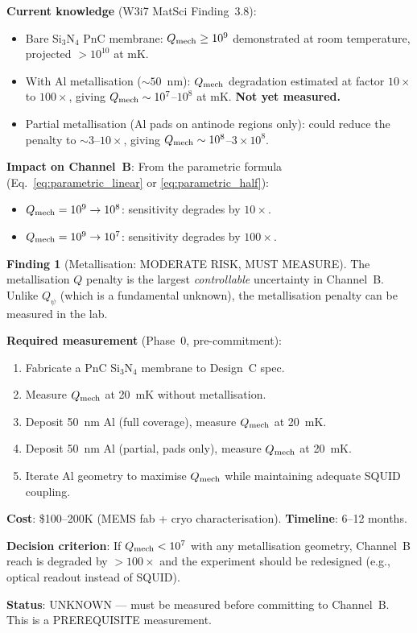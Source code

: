 \documentclass[11pt]{article}
\newcommand{\ee}[1]{\times 10^{#1}}
\newcommand{\Qpsi}{Q_\psi}
\newcommand{\Qmech}{Q_{\rm mech}}
\theoremstyle{definition}
\newtheorem{finding}[theorem]{Finding}
\theoremstyle{remark}
\begin{document}
\textbf{Current knowledge} (W3i7 MatSci Finding~3.8):
\begin{itemize}[nosep]
\item Bare Si$_3$N$_4$ PnC membrane: $\Qmech \geq 10^9$ demonstrated
  at room temperature, projected $> 10^{10}$ at mK.
\item With Al metallisation ($\sim 50$~nm): $\Qmech$ degradation
  estimated at factor $10\times$ to $100\times$, giving
  $\Qmech \sim 10^7$--$10^8$ at mK. \textbf{Not yet measured.}
\item Partial metallisation (Al pads on antinode regions only):
  could reduce the penalty to $\sim 3$--$10\times$, giving
  $\Qmech \sim 10^8$--$3\ee{8}$.
\end{itemize}

\textbf{Impact on Channel~B}: From the parametric formula
(Eq.~\eqref{eq:parametric_linear} or \eqref{eq:parametric_half}):
\begin{itemize}[nosep]
\item $\Qmech = 10^9 \to 10^8$: sensitivity degrades by $10\times$.
\item $\Qmech = 10^9 \to 10^7$: sensitivity degrades by $100\times$.
\end{itemize}

\begin{finding}[Metallisation: MODERATE RISK, MUST MEASURE]
\label{find:metallisation}
The metallisation $Q$ penalty is the largest \emph{controllable}
uncertainty in Channel~B. Unlike $\Qpsi$ (which is a fundamental
unknown), the metallisation penalty can be measured in the lab.

\textbf{Required measurement} (Phase~0, pre-commitment):
\begin{enumerate}[nosep]
\item Fabricate a PnC Si$_3$N$_4$ membrane to Design~C spec.
\item Measure $\Qmech$ at 20~mK without metallisation.
\item Deposit 50~nm Al (full coverage), measure $\Qmech$ at 20~mK.
\item Deposit 50~nm Al (partial, pads only), measure $\Qmech$ at 20~mK.
\item Iterate Al geometry to maximise $\Qmech$ while maintaining
  adequate SQUID coupling.
\end{enumerate}

\textbf{Cost}: \$100--200K (MEMS fab + cryo characterisation).
\textbf{Timeline}: 6--12 months.

\textbf{Decision criterion}: If $\Qmech < 10^7$ with any metallisation
geometry, Channel~B reach is degraded by $> 100\times$ and the
experiment should be redesigned (e.g., optical readout instead of
SQUID).

\textbf{Status}: \textcolor{conjcolor}{UNKNOWN --- must be measured
before committing to Channel~B. This is a PREREQUISITE measurement.}
\end{finding}
\end{document}
